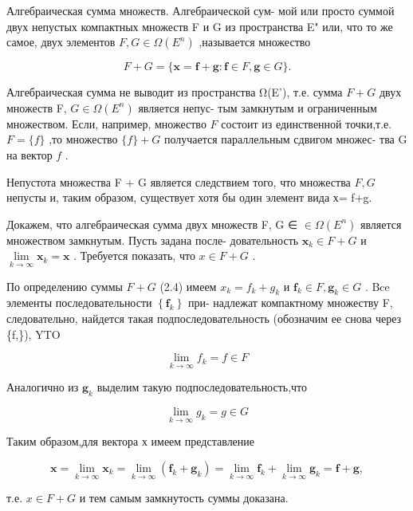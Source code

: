 \documentclass[8pt]{extarticle}
\begin{document}
Алгебраическая сумма множеств. Алгебраической сум- мой или просто суммой двух непустых компактных множеств F и G из пространства E" или, что то же самое, двух элементов \(F,G \in  \Omega \left( {E}^{n}\right)\) ,называется множество

\[
F + G = \{ \mathbf{x} = \mathbf{f} + \mathbf{g} : \mathbf{f} \in  F,\mathbf{g} \in  G\} . \tag{2.4}
\]

Алгебраическая сумма не выводит из пространства Ω(E’), т.е. сумма \(F + G\) двух множеств F, \(G \in  \Omega \left( {E}^{n}\right)\) является непус- тым замкнутым и ограниченным множеством. Если, например, множество \(F\) состоит из единственной точки,т.е. \(F = \{ f\}\) ,то множество \(\{ f\}  + G\) получается параллельным сдвигом множес- тва G на вектор \(f\) .

Непустота множества F + G является следствием того, что множества \(F,G\) непусты и, таким образом, существует хотя бы один элемент вида х= f+g.

Докажем, что алгебраическая сумма двух множеств F, G ∈ \(\in  \Omega \left( {E}^{n}\right)\) является множеством замкнутым. Пусть задана после- довательность \({\mathbf{x}}_{k} \in  F + G\) и \(\mathop{\lim }\limits_{{k \rightarrow  \infty }}{\mathbf{x}}_{k} = \mathbf{x}\) . Требуется показать, что \(x \in  F + G\) .

По определению суммы \(F + G\) (2.4) имеем \({x}_{k} = {f}_{k} + {g}_{k}\) и \({\mathbf{f}}_{k} \in  F,{\mathbf{g}}_{k} \in  G\) . Bce элементы последовательности \(\left\{  {\mathbf{f}}_{k}\right\}\) при- надлежат компактному множеству F, следовательно, найдется такая подпоследовательность (обозначим ее снова через \{f,\}), YTO

\[
\mathop{\lim }\limits_{{k \rightarrow  \infty }}{f}_{k} = f \in  F
\]

Аналогично из \({\mathbf{g}}_{k}\) выделим такую подпоследовательность,что

\[
\mathop{\lim }\limits_{{k \rightarrow  \infty }}{g}_{k} = g \in  G
\]

Таким образом,для вектора х имеем представление

\[
\mathbf{x} = \mathop{\lim }\limits_{{k \rightarrow  \infty }}{\mathbf{x}}_{k} = \mathop{\lim }\limits_{{k \rightarrow  \infty }}\left( {{\mathbf{f}}_{k} + {\mathbf{g}}_{k}}\right)  = \mathop{\lim }\limits_{{k \rightarrow  \infty }}{\mathbf{f}}_{k} + \mathop{\lim }\limits_{{k \rightarrow  \infty }}{\mathbf{g}}_{k} = \mathbf{f} + \mathbf{g},
\]

т.е. \(x \in  F + G\) и тем самым замкнутость суммы доказана.
\end{document}
